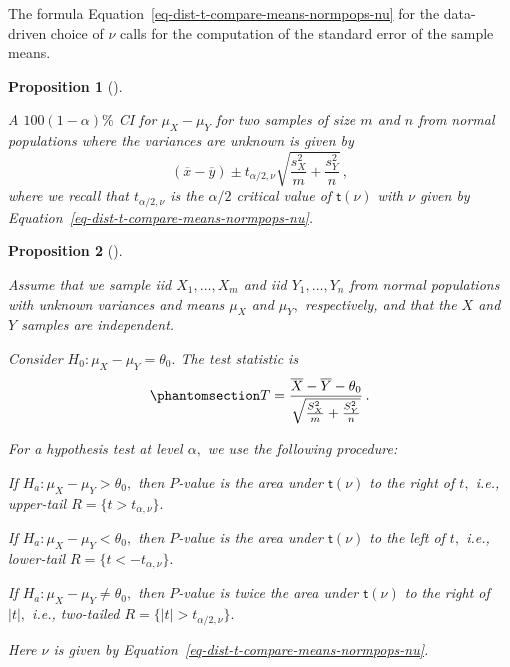 \documentclass[
  a4paper,
  DIV=11,
  numbers=noendperiod,
  oneside]{scrreprt}
\theoremstyle{definition}
\theoremstyle{definition}
\theoremstyle{plain}
\newtheorem{proposition}{Proposition}[chapter]
\theoremstyle{plain}
\theoremstyle{definition}
\theoremstyle{remark}
\begin{document}
The formula Equation~\ref{eq-dist-t-compare-means-normpops-nu} for the
data-driven choice of \(\nu\) calls for the computation of the standard
error of the sample means.

\begin{proposition}[]\protect\hypertarget{prp-ci-compare-means-normpops-vars-unknown}{}\label{prp-ci-compare-means-normpops-vars-unknown}

A \(100(1-\alpha)\%\) CI for \(\mu_X - \mu_Y\) for two samples of size
\(m\) and \(n\) from normal populations where the variances are unknown
is given by \[
 (\overline{x} - \overline{y}) \pm t_{\alpha/2, \nu} \sqrt{ \frac{s_X^2}{m} + \frac{s_Y^2}{n}}\,,
\] where we recall that \(t_{\alpha/2, \nu}\) is the \(\alpha/2\)
critical value of \(\mathsf{t}(\nu)\) with \(\nu\) given by
Equation~\ref{eq-dist-t-compare-means-normpops-nu}.

\end{proposition}

\begin{proposition}[]\protect\hypertarget{prp-htest-compare-means-normpops-vars-unknown}{}\label{prp-htest-compare-means-normpops-vars-unknown}

Assume that we sample iid \(X_1, \dots, X_m\) and iid
\(Y_1, \dots, Y_n\) from normal populations with unknown variances and
means \(\mu_X\) and \(\mu_Y,\) respectively, and that the \(X\) and
\(Y\) samples are independent.

Consider \(H_0 : \mu_X - \mu_Y = \theta_0.\) The test statistic is
\begin{equation}\phantomsection\label{eq-htest-compare-means-normpops-vars-unknown-statistic}{
 T = \frac{\overline{X} - \overline{Y} - \theta_0}{\sqrt{\frac{S_{X}^2}{m} + \frac{S_{Y}^2}{n}}}\,.
}\end{equation}

For a hypothesis test at level \(\alpha,\) we use the following
procedure:

If \(H_a : \mu_X - \mu_Y > \theta_0,\) then \(P\)-value is the area
under \(\mathsf{t}(\nu)\) to the right of \(t,\) i.e., upper-tail
\(R = \{t > t_{\alpha,\nu}\}.\)

If \(H_a : \mu_X - \mu_Y < \theta_0,\) then \(P\)-value is the area
under \(\mathsf{t}(\nu)\) to the left of \(t,\) i.e., lower-tail
\(R = \{t < - t_{\alpha,\nu}\}.\)

If \(H_a : \mu_X - \mu_Y \neq \theta_0,\) then \(P\)-value is twice the
area under \(\mathsf{t}(\nu)\) to the right of \(|t|,\) i.e., two-tailed
\(R = \{|t| > t_{\alpha/2, \nu}\}.\)

Here \(\nu\) is given by
Equation~\ref{eq-dist-t-compare-means-normpops-nu}.

\end{proposition}
\end{document}
